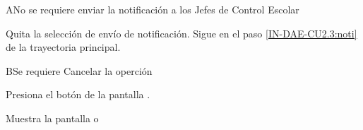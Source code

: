 
\begin{UCtrayectoriaA}{A}{No se requiere enviar la notificación a los Jefes de Control Escolar }
	
 	
	\UCpaso [\UCactor] Quita la selección de envío de notificación.
	\UCpaso Sigue en el paso \ref{IN-DAE-CU2.3:noti} de la trayectoria principal.
 
\end{UCtrayectoriaA}



\begin{UCtrayectoriaA}{B}{Se requiere Cancelar la operción}
	
	\UCpaso [\UCactor] 	Presiona el botón  de la pantalla .
	
	\UCpaso Muestra la pantalla  o  
	
\end{UCtrayectoriaA}

